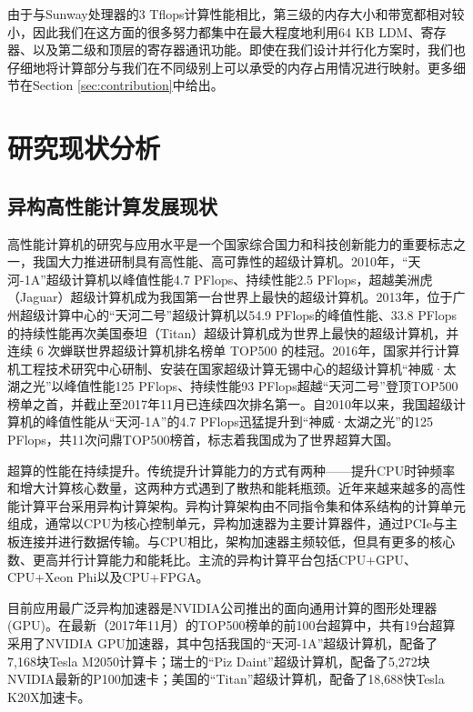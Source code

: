 \documentclass[degree=doctor]{thuthesis}
\begin{document}
由于与Sunway处理器的3 Tflops计算性能相比，第三级的内存大小和带宽都相对较小，因此我们在这方面的很多努力都集中在最大程度地利用64 KB LDM、寄存器、以及第二级和顶层的寄存器通讯功能。即使在我们设计并行化方案时，我们也仔细地将计算部分与我们在不同级别上可以承受的内存占用情况进行映射。更多细节在Section \ref{sec:contribution}中给出。

\chapter{研究现状分析}

\section{异构高性能计算发展现状}
高性能计算机的研究与应用水平是一个国家综合国力和科技创新能力的重要标志之一，我国大力推进研制具有高性能、高可靠性的超级计算机。2010年，“天河-1A”\cite{yang2011tianhe}超级计算机以峰值性能4.7 PFlops、持续性能2.5 PFlops，超越美洲虎（Jaguar）超级计算机成为我国第一台世界上最快的超级计算机。2013年，位于广州超级计算中心的“天河二号”超级计算机\cite{liao2014milkyway}以54.9 PFlops的峰值性能、33.8 PFlops的持续性能再次美国泰坦（Titan）超级计算机成为世界上最快的超级计算机，并连续 6 次蝉联世界超级计算机排名榜单 TOP500 的桂冠。2016年，国家并行计算机工程技术研究中心研制、安装在国家超级计算无锡中心的超级计算机“神威·太湖之光”\cite{fu2016sunway}以峰值性能125 PFlops、持续性能93 PFlops超越“天河二号”登顶TOP500榜单之首，并截止至2017年11月已连续四次排名第一。自2010年以来，我国超级计算机的峰值性能从“天河-1A”的4.7 PFlops迅猛提升到“神威·太湖之光”的125 PFlops，共11次问鼎TOP500榜首，标志着我国成为了世界超算大国。

超算的性能在持续提升。传统提升计算能力的方式有两种——提升CPU时钟频率和增大计算核心数量，这两种方式遇到了散热和能耗瓶颈。近年来越来越多的高性能计算平台采用异构计算架构\cite{buyya1999high}。异构计算架构由不同指令集和体系结构的计算单元组成，通常以CPU为核心控制单元，异构加速器为主要计算器件，通过PCIe与主板连接并进行数据传输。与CPU相比，架构加速器主频较低，但具有更多的核心数、更高并行计算能力和能耗比\cite{hong2010integrated}。主流的异构计算平台包括CPU+GPU、CPU+Xeon Phi以及CPU+FPGA。

目前应用最广泛异构加速器是NVIDIA公司推出的面向通用计算的图形处理器\cite{nvidia2008programming}(GPU)。在最新（2017年11月）的TOP500榜单的前100台超算中，共有19台超算采用了NVIDIA GPU加速器，其中包括我国的“天河-1A”超级计算机，配备了7,168块Tesla M2050计算卡；瑞士的“Piz Daint”超级计算机\cite{PIZDAINT}，配备了5,272块NVIDIA最新的P100加速卡；美国的“Titan”超级计算机\cite{shimpi2012inside}，配备了18,688快Tesla K20X加速卡。
\end{document}
